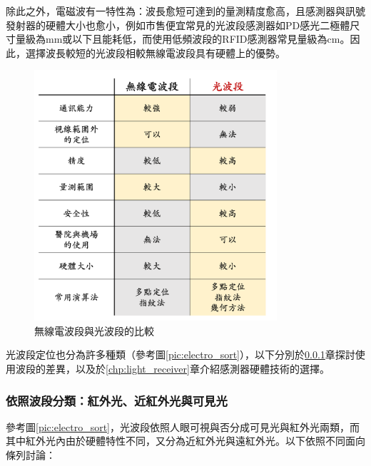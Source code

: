             除此之外，電磁波有一特性為：波長愈短可達到的量測精度愈高，且感測器與訊號發射器的硬體大小也愈小，例如市售便宜常見的光波段感測器如PD感光二極體尺寸量級為mm或以下\cite{datasheet:led_sfh4545}且能耗低，而使用低頻波段的RFID感測器常見量級為cm\cite{datasheet:rfid_tag}。因此，選擇波長較短的光波段相較無線電波段具有硬體上的優勢。

            \begin{figure}[htpb]
                \centering
                \includegraphics[width=9cm]{ch2pic/method_compare.png}
                \caption{無線電波段與光波段的比較}
                \label{pic:method_compare}
            \end{figure}


            光波段定位也分為許多種類（參考圖\ref{pic:electro_sort}），以下分別於\ref{chp:light_electro}章探討使用波段的差異，以及於\ref{chp:light_receiver}章介紹感測器硬體技術的選擇。


            \subsubsection{依照波段分類：紅外光、近紅外光與可見光}

            \label{chp:light_electro}

            參考圖\ref{pic:electro_sort}，光波段依照人眼可視與否分成可見光與紅外光兩類，而其中紅外光內由於硬體特性不同，又分為近紅外光與遠紅外光。以下依照不同面向條列討論：

